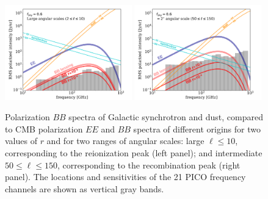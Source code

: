 \documentclass[PICOReport.tex]{subfiles}
\begin{document}

\begin{figure}[ht]
\includegraphics[width=0.49\textwidth]{images/sensitivity_vs_frequency_Jan3_2019_large_scale_v2.pdf}
\includegraphics[width=0.49\textwidth]{images/sensitivity_vs_frequency_Jan3_2019_2deg_scale_v2.pdf}
\vspace{-0.1in}
\caption{\captiontext
Polarization $BB$ spectra of Galactic synchrotron and dust, compared to CMB polarization $EE$ and $BB$ spectra of different origins for two values of $r$ and for two ranges of angular scales: large $\ell \leq 10$, corresponding to the reionization peak (left panel); and intermediate $50 \leq \ell \leq 150$, corresponding to the recombination peak (right panel). The locations and sensitivities of the 21 PICO frequency channels are shown as vertical gray bands. 
\label{fig:pico-channels-and-fg} }
\end{figure}
\end{document}
